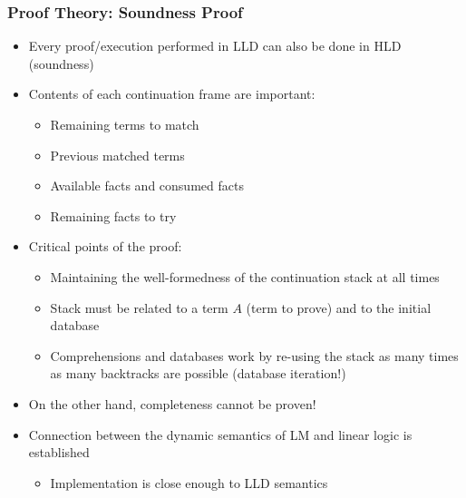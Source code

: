 \begin{frame}[fragile]
   \frametitle{Proof Theory: Soundness Proof}
   \begin{itemize}
      \item Every proof/execution performed in LLD can also be done in HLD (soundness)
      \item Contents of each continuation frame are important:
      \begin{itemize}
         \item Remaining terms to match
         \item Previous matched terms
         \item Available facts and consumed facts
         \item Remaining facts to try
      \end{itemize}
      \pause
      \item Critical points of the proof:
      \begin{itemize}
         \item Maintaining the well-formedness of the continuation stack at all times
         \item Stack must be related to a term $A$ (term to prove) and to the initial database
         \item Comprehensions and databases work by re-using the stack as many times as many backtracks are possible (database iteration!)
      \end{itemize}
      \pause
      \item On the other hand, completeness cannot be proven!
      \pause
      \item Connection between the dynamic semantics of LM and linear logic is established
      \begin{itemize}
         \item Implementation is close enough to LLD semantics
      \end{itemize}
   \end{itemize}
\end{frame}